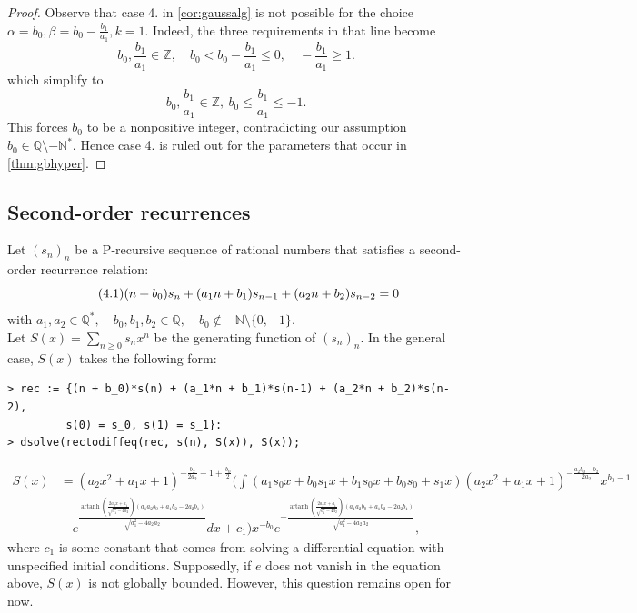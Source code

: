 \documentclass[11pt]{article}
\theoremstyle{definition}
\theoremstyle{plain}
\theoremstyle{remark}
\begin{document}
\begin{proof}
Observe that case 4. in \cref{cor:gaussalg} is not possible for the choice $\alpha = b_0, \beta = b_0-\frac{b_1}{a_1}, k = 1$.  Indeed, the three requirements in that line become
\[b_0,\frac{b_1}{a_1}\in\mathbb Z,\quad  b_0<b_0-\frac{b_1}{a_1}\le0, \quad -\frac{b_1}{a_1}\ge 1.\]
which simplify to
\[b_0,\frac{b_1}{a_1}\in\mathbb Z,\  b_0\le \frac{b_1}{a_1}\le -1.\]
This forces $b_0$ to be a nonpositive integer, contradicting our assumption $b_0 \in \mathbb{Q}\setminus -\mathbb{N}^*$. Hence case 4. is ruled out for the parameters that occur in \cref{thm:gbhyper}.
\end{proof}


\subsection{Second-order recurrences}\label{subsection: order 2}
Let $(s_n)_n$ be a P-recursive sequence of rational numbers that satisfies a second-order recurrence relation:
\begin{equation} \label{eq:{4.1}}\tag{4.1}
(n+b_0)s_n+(a_1n+b_1)s_{n-1} + (a_2n+b_2)s_{n-2}=0
\end{equation}
with $a_1,a_2 \in \mathbb{Q}^*, \quad b_0,b_1,b_2 \in \mathbb{Q}, \quad b_0 \not\in -\mathbb{N} \setminus \{0,-1\}$. \\ 
Let $S(x) = \sum\limits_{n \geq 0} s_nx^n$ be the generating function of $(s_n)_n$.
In the general case, $S(x)$ takes the following form:
\begin{verbatim}
> rec := {(n + b_0)*s(n) + (a_1*n + b_1)*s(n-1) + (a_2*n + b_2)*s(n-2), 
         s(0) = s_0, s(1) = s_1}:
> dsolve(rectodiffeq(rec, s(n), S(x)), S(x));
\end{verbatim}
\begin{align*}
S(x) &= (a_2 x^2 + a_1 x + 1)^{-\frac{b_2}{2 a_2} - 1 + \frac{b_0}{2}} 
\Bigg(\int 
\left( a_1 s_0 x + b_0 s_1 x + b_1 s_0 x + b_0 s_0 + s_1 x \right) 
(a_2 x^2 + a_1 x + 1)^{-\frac{a_2b_0-b_2}{2a_2}}x^{b_0-1} \\
&\quad e^{\frac{\operatorname{artanh} \left( \frac{2 a_2 x + a_1}{\sqrt{a_1^2 - 4 a_2}} \right)
\left(a_1a_2b_0 + a_1 b_2 - 2 a_2 b_1 \right)}{
\sqrt{a_1^2 - 4 a_2 }a_2}} dx 
+ c_1 \Bigg)x^{-b_0}e^{-\frac{\operatorname{artanh} \left( \frac{2 a_2 x + a_1}{\sqrt{a_1^2 - 4 a_2}} \right)
\left(a_1a_2b_0 + a_1 b_2 - 2 a_2 b_1 \right)}{
\sqrt{a_1^2 - 4 a_2 }a_2}},
\end{align*}
where $c_1$ is some constant that comes from solving a differential equation with unspecified initial conditions. Supposedly, if $e$ does not vanish in the equation above, $S(x)$ is not globally bounded. However, this question remains open for now.
\end{document}
